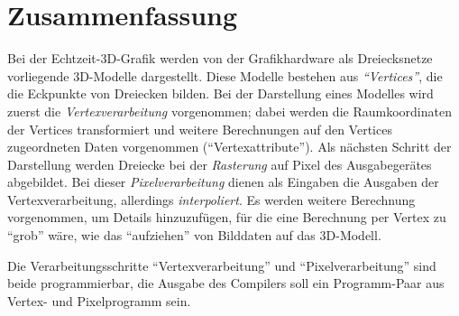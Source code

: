 \documentclass[twoside,a4paper,fleqn,12pt]{book}
\begin{document}
\section{Zusammenfassung}

Bei der Echtzeit-3D-Grafik werden von der Grafikhardware als Dreiecksnetze vorliegende 3D-Modelle dargestellt.
Diese Modelle bestehen aus \emph{``Vertices''}, die die Eckpunkte von Dreiecken bilden. Bei der Darstellung eines
Modelles wird zuerst die \emph{Vertexverarbeitung} vorgenommen; dabei werden die Raumkoordinaten der Vertices transformiert
und weitere Berechnungen auf den Vertices zugeordneten Daten vorgenommen ("`Vertexattribute"').
Als nächsten Schritt der Darstellung werden Dreiecke bei der \emph{Rasterung} auf Pixel des Ausgabegerätes abgebildet.
Bei dieser \emph{Pixelverarbeitung} dienen als Eingaben die Ausgaben der Vertexverarbeitung, allerdings \emph{interpoliert}.
Es werden weitere Berechnung vorgenommen, um Details hinzuzufügen, für die eine Berechnung per Vertex zu "`grob"' wäre,
wie das "`aufziehen"' von Bilddaten auf das 3D-Modell.

Die Verarbeitungsschritte "`Vertexverarbeitung"' und "`Pixelverarbeitung"' sind beide programmierbar, die Ausgabe des Compilers
soll ein Programm-Paar aus Vertex- und Pixelprogramm sein.




\end{document}
